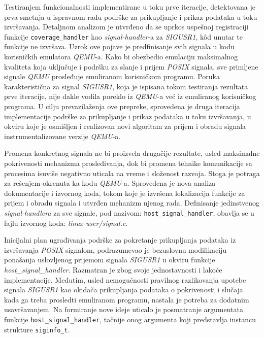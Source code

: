 \documentclass[12pt,oneside]{memoir}
\newcommand{\kod}[1]{\texttt{#1}}
\newcommand{\strano}[1]{\textit{#1}}
\begin{document}
Testiranjem funkcionalnosti implementirane u toku prve iteracije, detektovana je prva smetnja u ispravnom radu podrške za prikupljanje i prikaz podataka u toku izvršavanja. Detaljnom analizom je utvrđeno da se uprkos uspešnoj registraciji funkcije \kod{coverage\_handler} kao \strano{signal-handler}-a za \strano{SIGUSR1}, k\^{o}d unutar te funkcije ne izvršava. Uzrok ove pojave je predfinisanje svih signala u kodu korisničkih emulatora \strano{QEMU}-a. Kako bi obezbedio emulaciju maksimalnog kvaliteta koja uključuje i podršku za slanje i prijem \strano{POSIX} signala, sve primljene signale \strano{QEMU} prosleđuje emuliranom korisničkom programu. Poruka karakteristična za signal \strano{SIGUSR1}, koja je ispisana tokom testiranja rezultata prve iteracije, nije dakle vodila poreklo iz \strano{QEMU}-a već iz emuliranog korisničkog programa. U cilju prevazilaženja ove prepreke, sprovedena je druga iteracija implementacije podrške za prikupljanje i prikaz podataka u toku izvršavanja, u okviru koje je osmišljen i realizovan novi algoritam za prijem i obradu signala instrumentalizovane verzije \strano{QEMU}-a. 

Promena konkretnog signala ne bi proizvela drugačije rezultate, usled maksimalne pokrivenosti mehanizma prosleđivanja, dok bi promena tehnike komunikacije sa procesima isuviše negativno uticala na vreme i složenost razvoja. Stoga je potraga za rešenjem okrenuta ka kodu \strano{QEMU}-a. Sprovedena je nova analiza dokumentacije i izvornog koda, tokom koje je izvršena lokalizacija funkcije za prijem i obradu signala i utvrđen mehanizm njenog rada. Definisanje jedinstvenog \strano{signal-handlera} za sve signale, pod nazivom: \kod{host\_signal\_handler}, obavlja se u fajlu izvornog koda: \strano{linux-user/signal.c}. 

Inicijalni plan ugrađivanja podrške za pokretanje prikupljanja podataka iz izvršavanja \strano{POSIX} signalom, podrazumevao je bezuslovnu modifikaciju ponašanja uslovljenog prijemom signala \strano{SIGUSR1} u okviru funkcije \strano{host\_signal\_handler}. Razmatran je zbog svoje jednostavnosti i lakoće implementacije. Međutim, usled nemogućnosti pravilnog razlikovanja upotebe signala \strano{SIGUSR1} kao okidača prikupljanja podataka o pokrivenosti i slučaja kada ga treba prosledti emuliranom programu, nastala je potreba za dodatnim usavršavanjem. 
Na formiranje nove ideje uticalo je posmatranje argumentata funkcije \kod{host\_signal\_handler}, tačnije onog argumenta koji predstavlja instancu strukture \kod{siginfo\_t}. 
\end{document}

